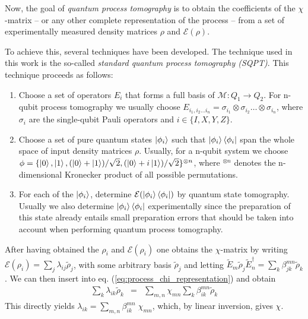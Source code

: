 Now, the goal of {\it quantum process tomography} is to obtain the coefficients of the $\chi$-matrix -- or any other complete representation of the process -- from a set of experimentally measured density matrices $\rho$ and $\mathcal{E}(\rho)$.

To achieve this, several techniques have been developed. The technique used in this work is the so-called {\it standard quantum process tomography (SQPT)}. This technique proceeds as follows:

\begin{enumerate}
\item Choose a set of operators $E_i$ that forms a full basis of $\mathcal{M}: Q_1 \to Q_2$. For n-qubit process tomography we usually choose $E_{i_1,i_2 \hdots i_n} = \sigma_{i_1}\otimes \sigma_{i_2}\hdots\otimes\sigma_{i_n}$, where $\sigma_i$ are the single-qubit Pauli operators and $i\in\{I,X,Y,Z\}$. 
\item Choose a set of pure quantum states $\left| \phi_i \right>$ such that $\left| \phi_i \right>\left< \phi_i \right|$ span the whole space of input density matrices $\rho$. Usually, for a n-qubit system we choose $\phi = \{\left| 0 \right>,\left| 1 \right>,(\left| 0 \right>+\left| 1 \right>)/\sqrt{2},(\left| 0 \right>+i\left| 1 \right>)/\sqrt{2}\}^{\otimes n}$, where $^{\otimes n}$ denotes the n-dimensional Kronecker product of all possible permutations.
\item For each of the $\left| \phi_i \right>$, determine $\mathcal{E}(\left| \phi_i \right>\left< \phi_i \right|)$ by quantum state tomography. Usually we also determine $\left| \phi_i \right>\left< \phi_i \right|$ experimentally since the preparation of this state already entails small preparation errors that should be taken into account when performing quantum process tomography. 
\end{enumerate}

After having obtained the $\rho_i$ and $\mathcal{E}(\rho_i)$ one obtains the $\chi$-matrix by writing $\mathcal{E}(\rho_i) = \sum_j \lambda_{ij} \tilde{\rho}_j$, with some arbitrary basis $\tilde{\rho}_j$ and
letting $\tilde{E}_m \tilde{\rho}_j \tilde{E}_n^\dagger = \sum_k \beta_{jk}^{mn}\tilde{\rho}_k$. We can then insert into eq. (\ref{eq:process_chi_representation}) and obtain
\begin{eqnarray}
\sum\limits_k \lambda_{ik} \tilde{\rho}_k & = & \sum\limits_{m,n} \chi_{mn} \sum\limits_k \beta_{ik}^{mn} \tilde{\rho}_k  
\end{eqnarray}
This directly yields $\lambda_{ik} = \sum_{m,n}\beta_{ik}^{mn}\; \chi_{mn}$, which, by linear inversion,  gives $\chi$.

